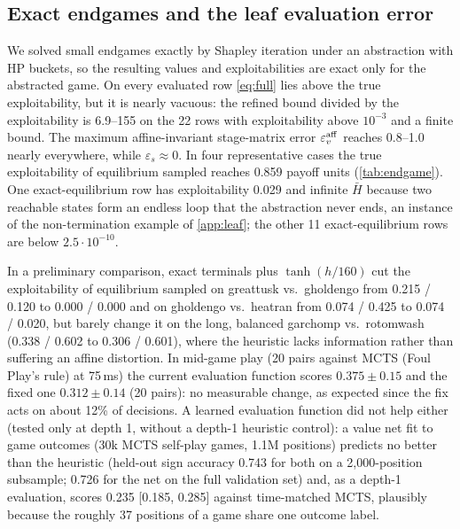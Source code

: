 \documentclass[10pt]{article}
\theoremstyle{plain}
\theoremstyle{definition}
\theoremstyle{remark}
\newcommand{\Hbar}{\bar H}
\newcommand{\epss}{\varepsilon_s}
\newcommand{\epsv}{\varepsilon_v}
\begin{document}
\subsection{Exact endgames and the leaf evaluation error}
\label{sec:exp-end}
We solved small endgames exactly by Shapley iteration under an abstraction with HP buckets, so the resulting values and exploitabilities are exact only for the abstracted game. On every evaluated row \eqref{eq:full} lies above the true exploitability, but it is nearly vacuous: the refined bound divided by the exploitability is 6.9--155 on the 22 rows with exploitability above $10^{-3}$ and a finite bound. The maximum affine-invariant stage-matrix error $\epsv^{\rm aff}$ reaches 0.8--1.0 nearly everywhere, while $\epss\approx0$. In four representative cases the true exploitability of equilibrium sampled reaches 0.859 payoff units (\cref{tab:endgame}). One exact-equilibrium row has exploitability 0.029 and infinite $\Hbar$ because two reachable states form an endless loop that the abstraction never ends, an instance of the non-termination example of \cref{app:leaf}; the other 11 exact-equilibrium rows are below $2.5\cdot10^{-10}$.

In a preliminary comparison, exact terminals plus $\tanh(h/160)$ cut the exploitability of equilibrium sampled on greattusk vs.\ gholdengo from 0.215 / 0.120 to 0.000 / 0.000 and on gholdengo vs.\ heatran from 0.074 / 0.425 to 0.074 / 0.020, but barely change it on the long, balanced garchomp vs.\ rotomwash (0.338 / 0.602 to 0.306 / 0.601), where the heuristic lacks information rather than suffering an affine distortion. In mid-game play (20 pairs against MCTS (Foul Play's rule) at 75\,ms) the current evaluation function scores $0.375\pm0.15$ and the fixed one $0.312\pm0.14$ (20 pairs): no measurable change, as expected since the fix acts on about 12\% of decisions. A learned evaluation function did not help either (tested only at depth 1, without a depth-1 heuristic control): a value net fit to game outcomes (30k MCTS self-play games, 1.1M positions) predicts no better than the heuristic (held-out sign accuracy 0.743 for both on a 2,000-position subsample; 0.726 for the net on the full validation set) and, as a depth-1 evaluation, scores 0.235 [0.185, 0.285] against time-matched MCTS, plausibly because the roughly 37 positions of a game share one outcome label.
\end{document}
